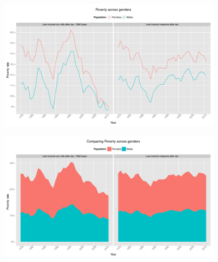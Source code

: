 \documentclass{article}\usepackage[]{graphicx}\usepackage[]{color}
\makeatletter
\def\maxwidth{ %
  \ifdim\Gin@nat@width>\linewidth
    \linewidth
  \else
    \Gin@nat@width
  \fi
}
\newenvironment{knitrout}{}{} %
\makeatother
\begin{document}
\begin{figure}[ht]
\begin{center}
\begin{knitrout}
\color{fgcolor}
\includegraphics[width=\maxwidth]{figure/unnamed-chunk-8} 

\end{knitrout}

\end{center}
\end{figure}
\begin{figure}[ht]
\begin{center}
\begin{knitrout}
\color{fgcolor}
\includegraphics[width=\maxwidth]{figure/unnamed-chunk-9} 

\end{knitrout}

\end{center}
\end{figure}
\end{document}
